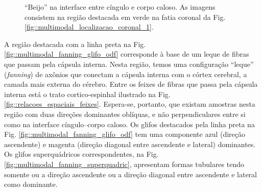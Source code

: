  \begin{figure}[H]
\centering
    \caption{``Beijo'' na interface entre cíngulo e corpo caloso. As imagens consistem na região destacada em verde na fatia coronal da Fig. \ref{fig::multimodal_localizacao_coronal_1}.
    }
    \label{fig::multimodal_cgcc}
\end{figure}

A região destacada com a linha preta na Fig. \ref{fig::multimodal_fanning_glifo_odf} corresponde à base de um leque de fibras que passam pela cápsula interna. Nesta região, temos uma configuração ``leque'' (\textit{fanning}) de axônios que conectam a cápsula interna com o córtex cerebral, a camada mais externa do cérebro. Entre os feixes de fibras que passa pela cápsula interna está o trato cortico-espinhal ilustrado na Fig. \ref{fig::relacoes_espaciais_feixes}. Espera-se, portanto, que existam amostras nesta região com duas direções dominantes oblíquas, e não perpendiculares entre si como na interface cíngulo--corpo caloso. Os glifos destacados pela linha preta na Fig. \ref{fig::multimodal_fanning_glifo_odf} tem uma componente azul (direção ascendente) e magenta (direção diagonal entre ascendente e lateral) dominantes. Os glifos superquádricos correspondentes, na Fig. \ref{fig::multimodal_fanning_superquadric}, apresentam formas tubulares tendo somente ou a direção ascendente ou a direção diagonal entre ascendente e lateral como dominante. %

